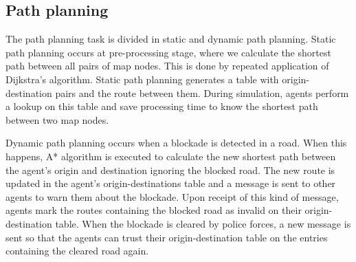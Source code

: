 \subsection{Path planning}
\label{sec:path}

The path planning task is divided in static and dynamic path planning. Static path planning occurs at pre-processing stage, where we calculate the shortest path between all pairs of map nodes. This is done by repeated application of Dijkstra's algorithm. Static path planning generates a table with origin-destination pairs and the route between them. During simulation, agents perform a lookup on this table and save processing time to know the shortest path between two map nodes.

Dynamic path planning occurs when a blockade is detected in a road. When this happens, A* algorithm is executed to calculate the new shortest path between the agent’s origin and destination ignoring the blocked road. The new route is updated in the agent’s origin-destinations table and a message is sent to other agents to warn them about the blockade. Upon receipt of this kind of message, agents mark the routes containing the blocked road as invalid on their origin-destination table. When the blockade is cleared by police forces, a new message is sent so that the agents can trust their origin-destination table on the entries containing the cleared road again.
